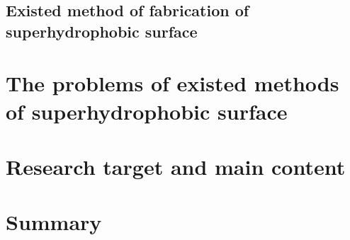 \subsection{Existed method of fabrication of superhydrophobic surface}

\section{The problems of existed methods of superhydrophobic surface}

\section{Research target and main content}

\section{Summary}



